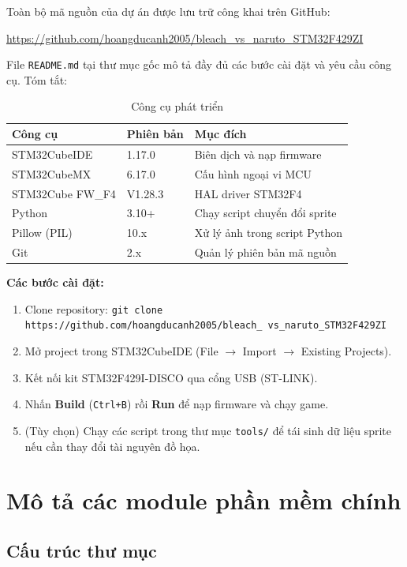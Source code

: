 \documentclass[a4paper,12pt]{report}
\begin{document}
Toàn bộ mã nguồn của dự án được lưu trữ công khai trên GitHub:

\begin{center}
    \url{https://github.com/hoangducanh2005/bleach_vs_naruto_STM32F429ZI}
\end{center}

\noindent File \texttt{README.md} tại thư mục gốc mô tả đầy đủ các bước cài đặt và yêu cầu công cụ. Tóm tắt:

\begin{table}[H]
\centering
\caption{Công cụ phát triển}
\begin{tabular}{l l l}
\toprule
\textbf{Công cụ} & \textbf{Phiên bản} & \textbf{Mục đích} \\
\midrule
STM32CubeIDE & 1.17.0 & Biên dịch và nạp firmware \\
STM32CubeMX & 6.17.0 & Cấu hình ngoại vi MCU \\
STM32Cube FW\_F4 & V1.28.3 & HAL driver STM32F4 \\
Python & 3.10+ & Chạy script chuyển đổi sprite \\
Pillow (PIL) & 10.x & Xử lý ảnh trong script Python \\
Git & 2.x & Quản lý phiên bản mã nguồn \\
\bottomrule
\end{tabular}
\end{table}

\noindent\textbf{Các bước cài đặt:}
\begin{enumerate}
    \item Clone repository: \texttt{git clone https://github.com/hoangducanh2005/bleach\_
    vs\_naruto\_STM32F429ZI}
    \item Mở project trong STM32CubeIDE (File $\to$ Import $\to$ Existing Projects).
    \item Kết nối kit STM32F429I-DISCO qua cổng USB (ST-LINK).
    \item Nhấn \textbf{Build} (\texttt{Ctrl+B}) rồi \textbf{Run} để nạp firmware và chạy game.
    \item (Tùy chọn) Chạy các script trong thư mục \texttt{tools/} để tái sinh dữ liệu sprite nếu cần thay đổi tài nguyên đồ họa.
\end{enumerate}

\section{Mô tả các module phần mềm chính}

\subsection{Cấu trúc thư mục}
\end{document}
